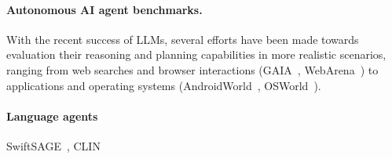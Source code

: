 \paragraph{Autonomous AI agent benchmarks.} With the recent success of LLMs, several efforts have been made towards evaluation their reasoning and planning capabilities in more realistic scenarios, ranging from web searches and browser interactions (GAIA~\citep{mialon2023gaia}, WebArena~\citep{zhou2024webarena}) to applications and operating systems (AndroidWorld~\citep{rawles2024androidworld}, OSWorld~\citep{xie2024osworld}).

\paragraph{Language agents} SwiftSAGE~\citep{Lin2023SwiftSageAG}, CLIN~\citep{Majumder2023CLINAC}
